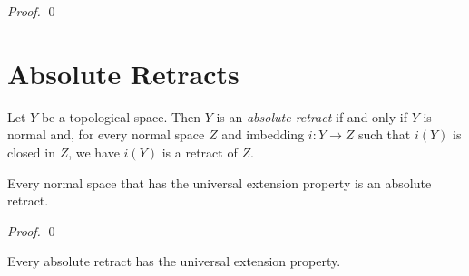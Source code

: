 \begin{proof}
    \pf
    \qed
\end{proof}

\section{Absolute Retracts}

\begin{definition}
    Let $Y$ be a topological space. Then $Y$ is an \emph{absolute retract} if and only if $Y$ is normal and,
    for every normal space $Z$ and imbedding $i : Y \rightarrow Z$ such that $i(Y)$ is closed in $Z$,
    we have $i(Y)$ is a retract of $Z$.
\end{definition}

\begin{proposition}
    Every normal space that has the universal extension property is an absolute retract.
\end{proposition}

\begin{proof}
    \pf
    \qed
\end{proof}

\begin{proposition}[Choice]
    Every absolute retract has the universal extension property.
\end{proposition}

